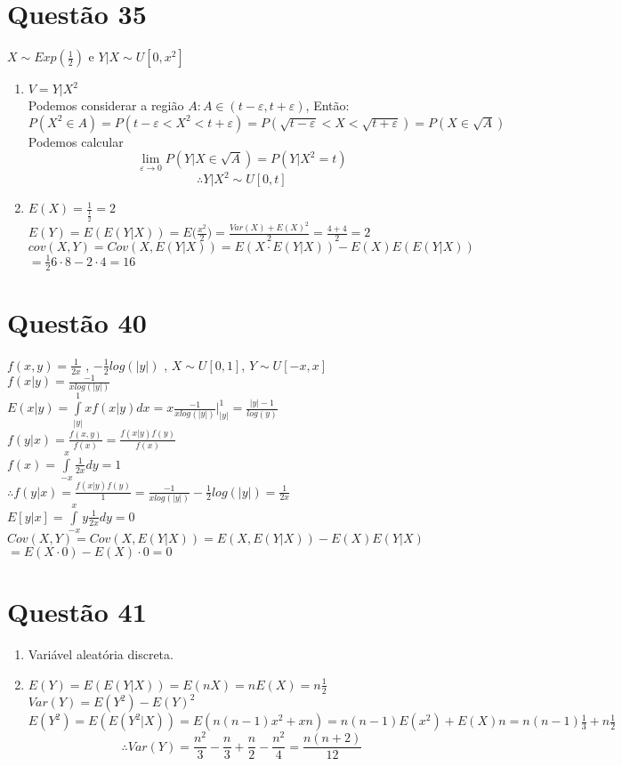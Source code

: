 \documentclass[a4paper,12pt]{report}
\begin{document}
\section{Questão 35}
$X\sim Exp(\frac{1}{2}) $ e $Y|X \sim U[0,x^2]$
\begin{enumerate}[label=\alph*)]
	\item $V=Y|X^2 $\\
Podemos considerar a região $A: A\in (t-\varepsilon,t+\varepsilon) $, Então:\\
$P(X^2\in A) = P(t-\varepsilon<X^2<t+\varepsilon)=P(\sqrt{t-\varepsilon} < X < \sqrt{t+\varepsilon}) = P(X \in \sqrt A )$\\

Podemos calcular 
$$\lim\limits_{\varepsilon\rightarrow 0}  P(Y|X \in \sqrt A ) =P(Y|X^2 = t)$$
$$\therefore Y|X^2\sim U[0,t]$$
\item $E(X)=\frac{1}{\frac{1}{2}} = 2$\\
$E(Y)=E(E(Y|X)) = E\bigg(\frac{x^2}{2}\bigg) = \frac{Var(X) +E(X)^2}{2} = \frac{4+4}{2}=2$\\
$cov(X,Y) = Cov(X,E(Y|X)) = E(X\cdot E(Y|X))- E(X)E(E(Y|X))$\\
$=\frac{1}{2}6\cdot 8 -2\cdot 4 = 16$ 
\end{enumerate}
\section{Questão 40}
$f(x,y) = \frac{1}{2x}$ , $-\frac{1}{2}log(|y|)$ , $X\sim U[0,1]$, $Y\sim U[-x,x]$\\
$f(x|y)= \frac{-1}{xlog(|y|)}$\\
$E(x|y) = \int\limits_{|y|}^1 xf(x|y)dx= x \frac{-1}{xlog(|y|)}\bigg|_{|y|}^1 = \frac{|y|-1}{log(y)}$\\
$f(y|x)= \frac{f(x,y)}{f(x)} = \frac{f(x|y)f(y)}{f(x)} $\\
$f(x) = \int\limits_{-x}^x \frac{1}{2x}dy=1$\\
$\therefore f(y|x) = \frac{f(x|y)f(y)}{1}= \frac{-1}{xlog(|y|)}- \frac{1}{2} log(|y|)=\frac{1}{2x}$\\
$E[y|x] = \int\limits_{-x}^x y\frac{1}{2x}dy=0$\\
$Cov(X,Y) = Cov(X,E(Y|X))= E(X,E(Y|X))-E(X)E(Y|X) $\\
$=E(X\cdot 0) - E(X)\cdot 0= 0 $
\section{Questão 41}
\begin{enumerate}[label = \alph*)]
	\item Variável aleatória discreta.
	\item $E(Y) = E(E(Y|X)) = E(nX) = nE(X) = n\frac{1}{2} $\\
	$Var(Y)= E(Y^2)-E(Y)^2$\\
	$E(Y^2)=E(E(Y^2|X)) = E(n(n-1)x^2+xn) = n(n-1)E(x^2)+E(X)n = n(n-1)\frac{1}{3}+n\frac{1}{2}$
	$$\therefore Var(Y) = \frac{n^2}{3}-\frac{n}{3} + \frac{n}{2}  - \frac{n^2}{4} = \frac{n(n+2)}{12}$$
	
\end{enumerate}
\end{document}
